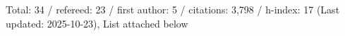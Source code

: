 Total: 34 / refereed: 23 / first author: 5 / citations: 3,798 / h-index: 17 (Last updated: 2025-10-23), List attached below